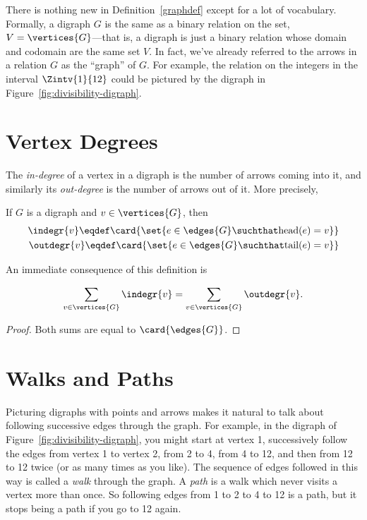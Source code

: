 There is nothing new in Definition~\ref{graphdef} except for a lot of
vocabulary.  Formally, a digraph $G$ is the same as a binary relation
on the set, $V = \vertices{G}$---that is, a digraph is just a binary
relation whose domain and codomain are the same set $V$.  In fact,
we've already referred to the arrows in a relation $G$ as the
``graph'' of $G$.  For example, the  relation on the
integers in the interval $\Zintv{1}{12}$ could be pictured by the
digraph in Figure~\ref{fig:divisibility-digraph}.

\section{Vertex Degrees}
The \emph{in-degree} of a vertex in a digraph is the number of arrows
coming into it, and similarly its \emph{out-degree} is the number of
arrows out of it.  More precisely,
\begin{definition}\label{digraph-degree}
If $G$ is a digraph and $v \in \vertices{G}$, then
\begin{align*}
\indegr{v} \eqdef \card{\set{ e \in \edges{G} \suchthat \text{head}(e) = v}}\\
\outdegr{v} \eqdef \card{\set{ e \in \edges{G} \suchthat \text{tail}(e) = v}}\\
\end{align*}
\end{definition}

An immediate consequence of this definition is
\begin{lemma}\label{digraph-handshake}
\[
\sum_{v \in \vertices{G}} \indegr{v} = \sum_{v \in \vertices{G}} \outdegr{v}.
\]
\end{lemma}
\begin{proof}
Both sums are equal to $\card{\edges{G}}$.
\end{proof}

\begin{problems}
\examproblems
{}
\end{problems}

\section{Walks and Paths}\label{sec:diwalks}
Picturing digraphs with points and arrows makes it natural to talk
about following successive edges through the graph.  For example, in
the digraph of Figure~\ref{fig:divisibility-digraph}, you might start
at vertex 1, successively follow the edges from vertex 1 to vertex 2,
from 2 to 4, from 4 to 12, and then from 12 to 12 twice (or as many
times as you like).  The sequence of edges followed in this way is
called a \emph{walk} through the graph.  A \emph{path} is a walk which
never visits a vertex more than once.  So following edges from 1 to 2
to 4 to 12 is a path, but it stops being a path if you go to 12 again.

